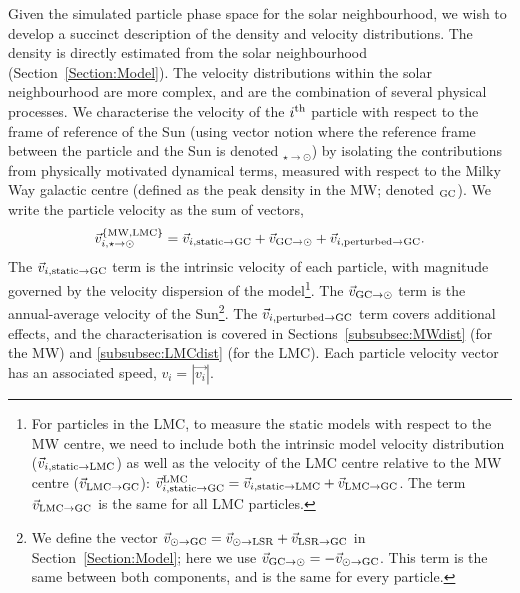 \documentclass[fleqn,usenatbib]{mnras}
\begin{document}
Given the simulated particle phase space for the solar neighbourhood, we wish to develop a succinct description of the density and velocity distributions. The density is  directly estimated from the solar neighbourhood (Section~\ref{Section:Model}). The velocity distributions within the solar neighbourhood are more complex, and are the combination of several physical processes. We characterise the velocity of the $i^{\rm th}$ particle with respect to the frame of reference of the Sun (using vector notion where the reference frame between the particle and the Sun is denoted ${}_{\star\to\odot}$) by isolating the contributions from physically motivated dynamical terms, measured with respect to the Milky Way galactic centre (defined as the peak density in the MW; denoted ${}_{\rm GC}$). We write the particle velocity as the sum of vectors,
\begin{equation}
\label{eqn:AllVelocityComponentsMW}
\vec{v}_{i,\star\to\odot}^{\{{\rm MW},{\rm LMC}\}}= \vec{v}_{i,{\rm static}\to {\rm GC}} + \vec{v}_{{\rm GC}\to\odot} + \vec{v}_{i,{\rm perturbed}\to{\rm GC}}.
\end{equation}
The $\vec{v}_{i,{\rm static}\to {\rm GC}}$ term is the intrinsic velocity of each particle, with magnitude governed by the velocity dispersion of the model\footnote{For particles in the LMC, to measure the static models with respect to the MW centre, we need to include both the intrinsic model velocity distribution ($\vec{v}_{i,{\rm static}\to {\rm LMC}}$) as well as the velocity of the LMC centre relative to the MW centre ($\vec{v}_{{\rm LMC}\to{\rm GC}}$): $\vec{v}_{i,{\rm static}\to {\rm GC}}^{\rm LMC} = \vec{v}_{i,{\rm static}\to {\rm LMC}} + \vec{v}_{{\rm LMC}\to{\rm GC}}$. The term $ \vec{v}_{{\rm LMC}\to{\rm GC}}$ is the same for all LMC particles.}. The $\vec{v}_{{\rm GC}\to\odot}$ term is the annual-average velocity of the Sun\footnote{We define the vector $\vec{v}_{\odot\to{\rm GC}}=\vec{v}_{\odot\to{\rm LSR}} + \vec{v}_{{\rm LSR}\to{\rm GC}}$ in Section~\ref{Section:Model}; here we use $\vec{v}_{{\rm GC}\to\odot} = -\vec{v}_{\odot\to{\rm GC}}$. This term is the same between both components, and is the same for every particle.}. 
The $\vec{v}_{i,{\rm perturbed}\to{\rm GC}}$ term covers additional effects, and the characterisation is covered in Sections~\ref{subsubsec:MWdist} (for the MW) and \ref{subsubsec:LMCdist} (for the LMC). 
Each particle velocity vector has an associated speed, $v_i = |\vec{v_i}|$. 
\end{document}
